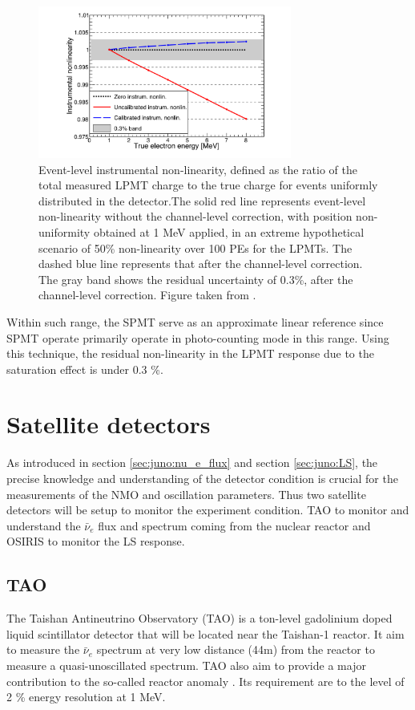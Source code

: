 \documentclass[../main.tex]{subfiles}
\begin{document}
\begin{figure}[ht]
  \centering
  \includegraphics[height=5cm]{images/juno/instr_non_linearity.png}
  \caption{Event-level instrumental non-linearity, defined as the ratio of the total measured LPMT charge to the true charge for events uniformly distributed in the detector.The solid red line represents event-level non-linearity without the channel-level correction, with position non-uniformity obtained at 1 MeV applied, in an extreme hypothetical scenario of 50\% non-linearity over 100 PEs for the LPMTs. The dashed blue line represents that after the channel-level correction. The gray band shows the residual uncertainty of 0.3\%, after the channel-level correction. Figure taken from \cite{juno_collaboration_calibration_2021}.}
  \label{fig:juno:instr_nl}
\end{figure}

Within such range, the SPMT serve as an approximate linear reference since SPMT operate primarily operate in photo-counting mode in this range. Using this technique, the residual non-linearity in the LPMT response due to the saturation effect is under 0.3 \%.


\section{Satellite detectors}
As introduced in section \ref{sec:juno:nu_e_flux} and section \ref{sec:juno:LS}, the precise knowledge and understanding of the detector condition is crucial for the measurements of the NMO and oscillation parameters. Thus two satellite detectors will be setup to monitor the experiment condition. TAO to monitor and understand the $\bar{\nu}_e$ flux and spectrum coming from the nuclear reactor and OSIRIS to monitor the LS response.

\subsection{TAO}
\label{sec:juno:tao}
The Taishan Antineutrino Observatory (TAO) \cite{juno_collaboration_tao_2020, steiger_tao_2022} is a ton-level gadolinium doped liquid scintillator detector that will be located near the Taishan-1 reactor. It aim to measure the $\bar{\nu}_e$ spectrum at very low distance (44m) from the reactor to measure a quasi-unoscillated spectrum. TAO also aim to provide a major contribution to the so-called reactor anomaly \cite{mention_reactor_2011}. Its requirement are to the level of 2 \% energy resolution at 1 MeV.
\end{document}
